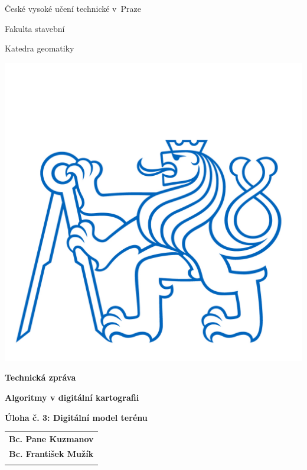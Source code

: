 \documentclass[a4paper, 12pt, oneside, titlepage]{article} %
\begin{document}
\setcounter{page}{1}   %
\thispagestyle{empty}

\begin{center}

\large

\v{C}eské vysoké učení technické v~Praze

\medskip

Fakulta stavební
\medskip

Katedra geomatiky

\vfill
\centerline{\mbox{\includegraphics[scale=1.3]{obrazky/symbol_cvut_konturova_verze.jpg}} }


{\bf\Large Technická zpráva}

\vfill

{\bf\LARGE\bfseries Algoritmy v digitální kartografii}

\vfill

{\bf\Large Úloha č. 3: Digitální model terénu}


\vfill



\vfill
\vspace{5mm}

\begin{tabular}{c}

{\bf Bc. Pane Kuzmanov}\\
\noalign{\vspace{2mm}}
{\bf Bc. František Mužík}\\
\noalign{\vspace{10mm}}


\end{tabular}
\end{center}
\end{document}
